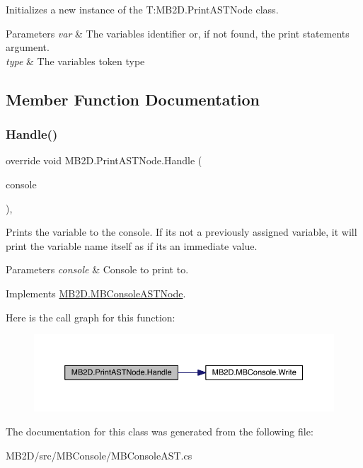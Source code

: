 Initializes a new instance of the T\+:\+M\+B2\+D.\+Print\+A\+S\+T\+Node class. 


\begin{DoxyParams}{Parameters}
{\em var} & The variables identifier or, if not found, the print statements argument. \\
\hline
{\em type} & The variables token type\\
\hline
\end{DoxyParams}


\subsection{Member Function Documentation}
\hypertarget{class_m_b2_d_1_1_print_a_s_t_node_a61d2408e999df07c1190f6ba8bb6ad3f}{}\label{class_m_b2_d_1_1_print_a_s_t_node_a61d2408e999df07c1190f6ba8bb6ad3f} 
\subsubsection{\texorpdfstring{Handle()}{Handle()}}
{\footnotesize\ttfamily override void M\+B2\+D.\+Print\+A\+S\+T\+Node.\+Handle (\begin{DoxyParamCaption}\item[{\hyperlink{class_m_b2_d_1_1_m_b_console}{M\+B\+Console}}]{console }\end{DoxyParamCaption})\hspace{0.3cm}{\ttfamily [inline]}, {\ttfamily [virtual]}}



Prints the variable to the console. If it\textquotesingle{}s not a previously assigned variable, it will print the variable name itself as if it\textquotesingle{}s an immediate value. 


\begin{DoxyParams}{Parameters}
{\em console} & Console to print to.\\
\hline
\end{DoxyParams}


Implements \hyperlink{class_m_b2_d_1_1_m_b_console_a_s_t_node_aa70a49e61ab623698af4ed8fda4ebbf5}{M\+B2\+D.\+M\+B\+Console\+A\+S\+T\+Node}.

Here is the call graph for this function\+:\nopagebreak
\begin{figure}[H]
\begin{center}
\leavevmode
\includegraphics[width=350pt]{class_m_b2_d_1_1_print_a_s_t_node_a61d2408e999df07c1190f6ba8bb6ad3f_cgraph}
\end{center}
\end{figure}


The documentation for this class was generated from the following file\+:\begin{DoxyCompactItemize}
\item 
M\+B2\+D/src/\+M\+B\+Console/M\+B\+Console\+A\+S\+T.\+cs\end{DoxyCompactItemize}
